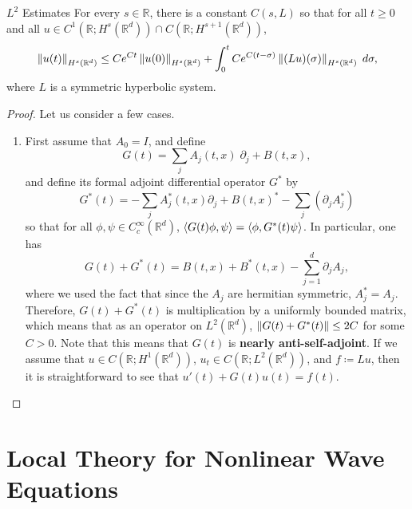 \documentclass{article}
\begin{document}
\begin{prop}{$L^{2}$ Estimates}
	For every $s \in \mathbb{R}$, there is a constant $C(s, L)$ so that for all $t \geq 0$ and all $u \in C^{1}(\mathbb{R}; H^{s}(\mathbb{R}^{d})) \cap C(\mathbb{R}; H^{s + 1}(\mathbb{R}^{d}))$, 
	\begin{equation*}
		\left\Vert u(t) \right\Vert_{H^{s}(\mathbb{R}^{d})} \leq Ce^{Ct}\left\Vert u(0) \right\Vert_{H^{s}(\mathbb{R}^{d})} + \int_{0}^{t}Ce^{C(t - \sigma)} \left\Vert (Lu)(\sigma) \right\Vert_{H^{s}(\mathbb{R}^{d})}\;d\sigma, 
	\end{equation*} 
	where $L$ is a symmetric hyperbolic system. 
\end{prop}
\begin{proof}
	Let us consider a few cases. \vspace{-0.4cm} 
	\begin{enumerate}
		\item First assume that $A_{0} = I$, and define 
		\begin{equation*}
			G(t) = \sum_{j}A_{j}(t, x)\;\partial_{j} + B(t, x), 
		\end{equation*} 
		and define its formal adjoint differential operator $G^{\ast}$ by 
		\begin{equation*}
			G^{\ast}(t) = -\sum_{j}A_{j}^{\ast}(t, x)\partial_{j} + B(t, x)^{\ast} - \sum_{j}(\partial_{j}A_{j}^{\ast})  
		\end{equation*} 
		so that for all $\phi, \psi \in C_{c}^{\infty}(\mathbb{R}^{d})$, $\braket{G(t)\phi, \psi} = \braket{\phi, G^{\ast}(t)\psi}$. In particular, one has 
		\begin{equation*}
			G(t) + G^{\ast}(t) = B(t,x) + B^{\ast}(t, x) - \sum_{j = 1}^{d}\partial_{j}A_{j}, 
		\end{equation*} 
		where we used the fact that since the $A_{j}$ are hermitian symmetric, $A_{j}^{\ast} = A_{j}$. Therefore, $G(t) + G^{\ast}(t)$ is multiplication by a uniformly bounded matrix, which means that as an operator on $L^{2}(\mathbb{R}^{d})$, $\left\Vert G(t) + G^{\ast}(t) \right\Vert \leq 2C$ for some $C > 0$. Note that this means that $G(t)$ is \textbf{nearly anti-self-adjoint}. If we assume that $u \in C(\mathbb{R}; H^{1}(\mathbb{R}^{d}))$, $u_{t} \in C(\mathbb{R}; L^{2}(\mathbb{R}^{d}))$, and $f \coloneqq Lu$, then it is straightforward to see that $u'(t) + G(t)u(t) = f(t)$. 
	\end{enumerate}
\end{proof} 


\newpage 

\section{Local Theory for Nonlinear Wave Equations}
\end{document}
